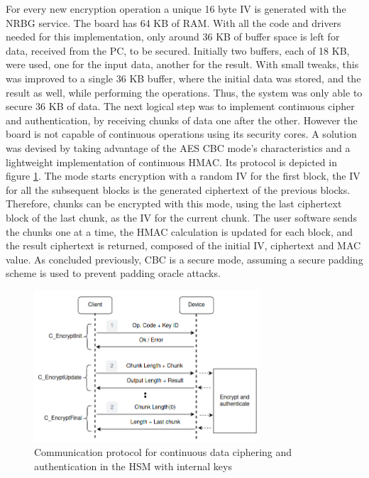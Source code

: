 For every new encryption operation a unique 16 byte \ac{IV} is generated with the \ac{NRBG} service.
The board has 64 KB of RAM. With all the code and drivers needed for this implementation, only around 36 KB of buffer space is left for data, received from the PC, to be secured. Initially two buffers, each of 18 KB, were used, one for the input data, another for the result. With small tweaks, this was improved to a single 36 KB buffer, where the initial data was stored, and the result as well, while performing the operations. Thus, the system was only able to secure 36 KB of data. The next logical step was to implement continuous cipher and authentication, by receiving chunks of data one after the other. However the board is not capable of continuous operations using its security cores.
A solution was devised by taking advantage of the AES \ac{CBC} mode's characteristics and a lightweight implementation of continuous HMAC. Its protocol is depicted in figure \ref{fig:protocol:data-exchange-chunks}. The mode starts encryption with a random IV for the first block, the IV for all the subsequent blocks is the generated ciphertext of the previous blocks. Therefore, chunks can be encrypted with this mode, using the last ciphertext block of the last chunk, as the IV for the current chunk. The user software sends the chunks one at a time, the HMAC calculation is updated for each block, and the result ciphertext is returned, composed of the initial IV, ciphertext and MAC value.
As concluded previously, CBC is a secure mode, assuming a secure padding scheme is used to prevent padding oracle attacks.

\begin{figure}[h!]
	\centering
	\includegraphics[width=0.75\textwidth]{./Images/data-exchange-chunks.png}
	\caption{Communication protocol for continuous data ciphering and authentication in the HSM with internal keys}
	\label{fig:protocol:data-exchange-chunks}
\end{figure}

